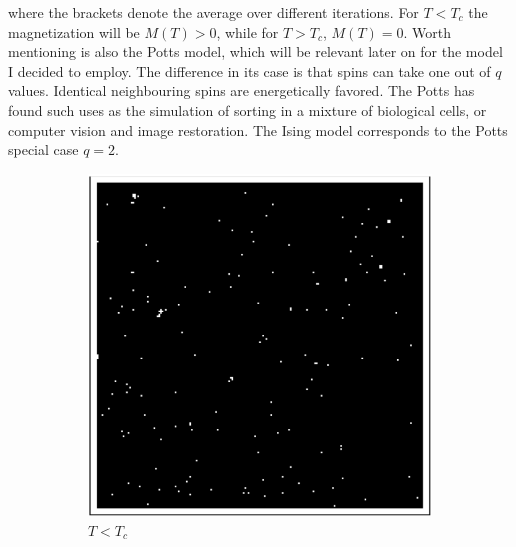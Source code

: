 \documentclass[12pt,openright,twoside]{book}
\begin{document}
\vspace{14pt}

where the brackets denote the average over different iterations. For $T<T_c$ the magnetization will be $M(T)>0$, while for $T>T_c$, $M(T)=0$. Worth mentioning is also the Potts model\cite{wu_1982}, which will be relevant later on for the model I decided to employ. The difference in its case is that spins can take one out of $q$ values. Identical neighbouring spins are energetically favored. The Potts has found such uses as the simulation of sorting in a mixture of biological cells\cite{graner_glazier_1992}, or computer vision and image restoration\cite{boykov_veksler_zabih_2001}. The Ising model corresponds to the Potts special case $q=2$.\\

\begin{figure}
\centering
\begin{subfigure}[b]{0.3\linewidth}
    \includegraphics[width=\linewidth]{figures/t<t_c.PNG}
    \caption{$T<T_c$}
\end{subfigure}
\begin{subfigure}[b]{0.3\linewidth}

\end{subfigure}
\end{figure}
\end{document}
